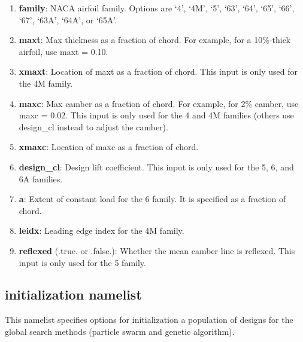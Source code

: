 \documentclass[11pt]{article}
\begin{document}
\begin{enumerate}
\item{\textbf{family}: NACA airfoil family. Options are `4', `4M', `5', `63', `64', `65',
`66', `67', `63A', `64A', or `65A'.}
\item{\textbf{maxt}: Max thickness as a fraction of chord. For example, for a 10\%-thick
airfoil, use maxt = 0.10.}
\item{\textbf{xmaxt}: Location of maxt as a fraction of chord. This input is only used for
the 4M family.}
\item{\textbf{maxc}: Max camber as a fraction of chord. For example, for 2\% camber, use
maxc = 0.02. This input is only used for the 4 and 4M families (others use design\_cl 
instead to adjust the camber).} 
\item{\textbf{xmaxc}: Location of maxc as a fraction of chord.}
\item{\textbf{design\_cl}: Design lift coefficient. This input is only used for the 5, 6,
and 6A families.}
\item{\textbf{a}: Extent of constant load for the 6 family. It is specified as a fraction
of chord.}
\item{\textbf{leidx}: Leading edge index for the 4M family.}
\item{\textbf{reflexed} (.true. or .false.): Whether the mean camber line is reflexed.
This input is only used for the 5 family.}
\end{enumerate}

\subsection{initialization namelist}

This namelist specifies options for initialization a population of designs for the global
search methods (particle swarm and genetic algorithm).
\end{document}
